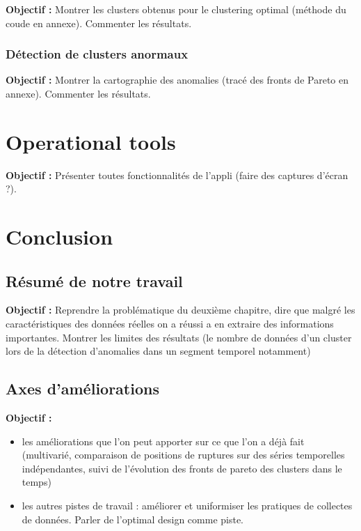 \documentclass[12pt, twoside]{report}
\begin{document}
\textbf{Objectif :} Montrer les clusters obtenus pour le clustering optimal (méthode du coude en annexe). Commenter les résultats. 

\subsection{Détection de clusters anormaux}

\textbf{Objectif :} Montrer la cartographie des anomalies (tracé des fronts de Pareto en annexe). Commenter les résultats. 

\chapter{Operational tools}

\textbf{Objectif :} Présenter toutes fonctionnalités de l'appli (faire des captures d'écran ?). 

\chapter{Conclusion}

\section{Résumé de notre travail}

\textbf{Objectif :} Reprendre la problématique du deuxième chapitre, dire que malgré les caractéristiques des données réelles on a réussi a en extraire des informations importantes. Montrer les limites des résultats (le nombre de données d'un cluster lors de la détection d'anomalies dans un segment temporel notamment)

\section{Axes d'améliorations}

\textbf{Objectif :}
\begin{itemize}
\item les améliorations que l'on peut apporter sur ce que l'on a déjà fait (multivarié, comparaison de positions de ruptures sur des séries temporelles indépendantes, suivi de l'évolution des fronts de pareto des clusters dans le temps)
\item les autres pistes de travail : améliorer et uniformiser les pratiques de collectes de données. Parler de l'optimal design comme piste. 
\end{itemize}
\end{document}
